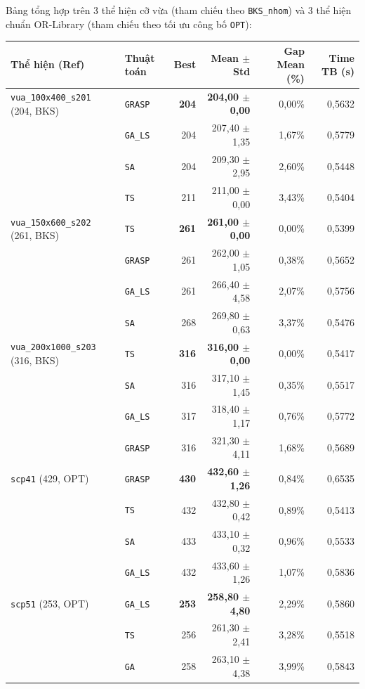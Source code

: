 Bảng tổng hợp trên 3 thể hiện cỡ vừa (tham chiếu theo \texttt{BKS\_nhom}) và 3 thể hiện chuẩn OR-Library (tham chiếu theo tối ưu công bố \texttt{OPT}):
\begin{center}
\small
\begin{tabular}{llrrrr}
\toprule
Thể hiện (Ref) & Thuật toán & Best & Mean $\pm$ Std & Gap Mean (\%) & Time TB (s) \\
\midrule
\texttt{vua\_100x400\_s201} (204, BKS) & \texttt{GRASP} & \textbf{204} & \textbf{204,00 $\pm$ 0,00} & 0,00\% & 0,5632 \\
 & \texttt{GA\_LS} & 204 & 207,40 $\pm$ 1,35 & 1,67\% & 0,5779 \\
 & \texttt{SA} & 204 & 209,30 $\pm$ 2,95 & 2,60\% & 0,5448 \\
 & \texttt{TS} & 211 & 211,00 $\pm$ 0,00 & 3,43\% & 0,5404 \\
\midrule
\texttt{vua\_150x600\_s202} (261, BKS) & \texttt{TS} & \textbf{261} & \textbf{261,00 $\pm$ 0,00} & 0,00\% & 0,5399 \\
 & \texttt{GRASP} & 261 & 262,00 $\pm$ 1,05 & 0,38\% & 0,5652 \\
 & \texttt{GA\_LS} & 261 & 266,40 $\pm$ 4,58 & 2,07\% & 0,5756 \\
 & \texttt{SA} & 268 & 269,80 $\pm$ 0,63 & 3,37\% & 0,5476 \\
\midrule
\texttt{vua\_200x1000\_s203} (316, BKS) & \texttt{TS} & \textbf{316} & \textbf{316,00 $\pm$ 0,00} & 0,00\% & 0,5417 \\
 & \texttt{SA} & 316 & 317,10 $\pm$ 1,45 & 0,35\% & 0,5517 \\
 & \texttt{GA\_LS} & 317 & 318,40 $\pm$ 1,17 & 0,76\% & 0,5772 \\
 & \texttt{GRASP} & 316 & 321,30 $\pm$ 4,11 & 1,68\% & 0,5689 \\
\midrule
\texttt{scp41} (429, OPT) & \texttt{GRASP} & \textbf{430} & \textbf{432,60 $\pm$ 1,26} & 0,84\% & 0,6535 \\
 & \texttt{TS} & 432 & 432,80 $\pm$ 0,42 & 0,89\% & 0,5413 \\
 & \texttt{SA} & 433 & 433,10 $\pm$ 0,32 & 0,96\% & 0,5533 \\
 & \texttt{GA\_LS} & 432 & 433,60 $\pm$ 1,26 & 1,07\% & 0,5836 \\
\midrule
\texttt{scp51} (253, OPT) & \texttt{GA\_LS} & \textbf{253} & \textbf{258,80 $\pm$ 4,80} & 2,29\% & 0,5860 \\
 & \texttt{TS} & 256 & 261,30 $\pm$ 2,41 & 3,28\% & 0,5518 \\
 & \texttt{GA} & 258 & 263,10 $\pm$ 4,38 & 3,99\% & 0,5843 \\

\end{tabular}
\end{center}
